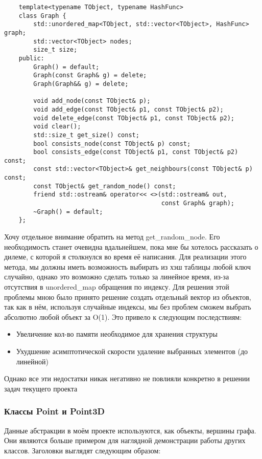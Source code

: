 \begin{verbatim}
    template<typename TObject, typename HashFunc>
    class Graph {
        std::unordered_map<TObject, std::vector<TObject>, HashFunc> graph;
        std::vector<TObject> nodes;
        size_t size;
    public:
        Graph() = default;
        Graph(const Graph& g) = delete;
        Graph(Graph&& g) = delete;

        void add_node(const TObject& p);
        void add_edge(const TObject& p1, const TObject& p2);
        void delete_edge(const TObject& p1, const TObject& p2);
        void clear();
        std::size_t get_size() const;
        bool consists_node(const TObject& p) const;
        bool consists_edge(const TObject& p1, const TObject& p2) const;
        const std::vector<TObject>& get_neighbours(const TObject& p) const;
        const TObject& get_random_node() const;
        friend std::ostream& operator<< <>(std::ostream& out, 
                                           const Graph& graph);
        ~Graph() = default;
    };
\end{verbatim}
Хочу отдельное внимание обратить на метод get\_random\_node. Его необходимость 
станет очевидна вдальнейшем, пока мне бы хотелось рассказать о дилеме, с которой я столкнулся
во время её написания. Для реализации этого метода, мы должны иметь возможность выбирать из хэш таблицы
любой ключ случайно, однако это возможно сделать только за линейное время, из-за отсутствия в 
unordered\_map обращения по индексу. Для решения этой проблемы мною было принято решение создать отдельный
вектор из объектов, так как в нём, используя случайные индексы, мы без проблем сможем выбрать 
абсолютно любой объект за O(1). 
Это привело к следующим последствиям:
\begin{itemize}
    \item Увеличение кол-во памяти необходимое для хранения структуры
    \item Ухудшение асимптотической скорости удаление выбранных элементов (до линейной)
\end{itemize}
Однако все эти недостатки никак негативно не повлияли конкретно в решении задач текущего проекта 


\subsubsection{Классы Point и Point3D}

Данные абстракции в моём проекте используются, как объекты, вершины графа. 
Они являются больше примером для наглядной демонстрации работы других классов.
Заго\-ловки выглядят следующим образом:


